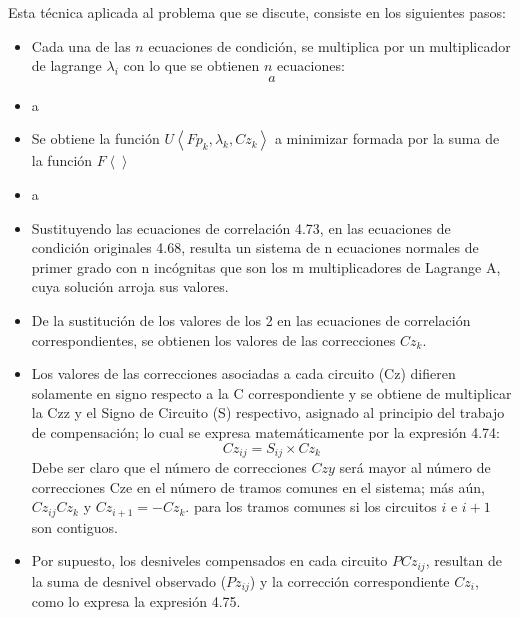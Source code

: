 Esta técnica aplicada al problema que se discute, consiste en los siguientes pasos:
\begin{itemize}
    \item Cada una de las $n$ ecuaciones de condición, se multiplica por un multiplicador de lagrange $\lambda_i$ con lo que se obtienen $n$ ecuaciones:
    \begin{equation}
        a
    \end{equation}
    \item a
    \item Se obtiene la función $U\left\langle Fp_k,\lambda_k,Cz_k \right\rangle $ a minimizar formada por la suma de la función $F\left\langle \right\rangle $
    \item a
    \item Sustituyendo las ecuaciones de correlación 4.73, en las ecuaciones de condición originales 4.68, resulta un sistema de n ecuaciones normales de primer grado con n incógnitas que son los m multiplicadores de Lagrange A, cuya solución arroja sus valores.
    \item De la sustitución de los valores de los 2 en las ecuaciones de correlación correspondientes, se obtienen los valores de las correcciones $Cz_k$.
    \item Los valores de las correcciones asociadas a cada circuito (Cz) difieren solamente en signo respecto a la C correspondiente y se obtiene de multiplicar la Czz y el Signo de Circuito (S) respectivo, asignado al principio del trabajo de compensación; lo cual se expresa matemáticamente por la expresión 4.74:
    \begin{equation}
        Cz_{ij} = S_{ij} \times Cz_k
    \end{equation}
    Debe ser claro que el número de correcciones $Czy$ será mayor al número de correcciones Cze en el número de tramos comunes en el sistema; más aún, $Cz_{ij} Cz_k$ y $Cz_{i+1}=-Cz_k$. para los tramos comunes si los circuitos $i$ e $i+1$ son contiguos.
    \item Por supuesto, los desniveles compensados en cada circuito $PCz_{ij}$, resultan de la suma de desnivel observado ($Pz_{ij}$) y la corrección correspondiente $Cz_i$, como lo expresa la expresión 4.75.
\end{itemize}
